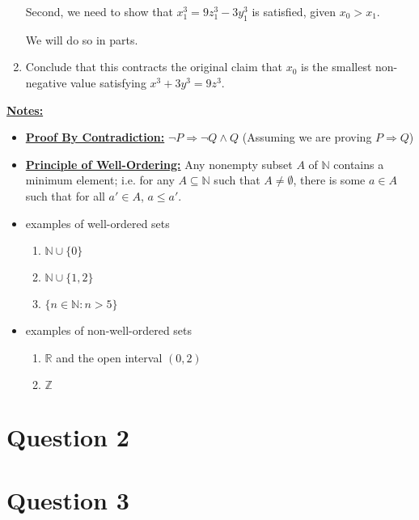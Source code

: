 \documentclass[12pt]{article}
\begin{document}
\begin{mdframed}
\begin{enumerate}[1.]
        \bigskip

        \begin{mdframed}
        Second, we need to show that $x_1^3 = 9z_1^3 - 3y_1^3$ is satisfied, given
        $x_0 > x_1$.

        \bigskip

        We will do so in parts.

        \bigskip


        \end{mdframed}

        \item Conclude that this contracts the original claim that $x_0$ is the smallest
        non-negative value satisfying $x^3 + 3y^3 = 9z^3$.

        \begin{mdframed}

        \end{mdframed}
    \end{enumerate}

\end{mdframed}

\bigskip

\underline{\textbf{Notes:}}

\begin{itemize}
    \item \underline{\textbf{Proof By Contradiction:}} $\neg P \Rightarrow \neg Q \land Q$ (Assuming
    we are proving $P \Rightarrow Q$)
    \item \underline{\textbf{Principle of Well-Ordering:}} Any nonempty subset $A$
    of $\mathbb{N}$ contains a minimum element; i.e. for any $A \subseteq \mathbb{N}$
    such that $A \neq \emptyset$, there is some $a \in A$ such that for all $a' \in A$, $a \leq a'$.

    \item examples of well-ordered sets
    \begin{enumerate}[1.]
        \item $\mathbb{N} \cup \{0\}$
        \item $\mathbb{N} \cup \{1,2\}$
        \item $\{n \in \mathbb{N}: n > 5\}$
    \end{enumerate}
    \item examples of non-well-ordered sets
    \begin{enumerate}[1.]
        \item $\mathbb{R}$ and the open interval $(0,2)$
        \item $\mathbb{Z}$
    \end{enumerate}
\end{itemize}

\section*{Question 2}

\section*{Question 3}
\end{document}
